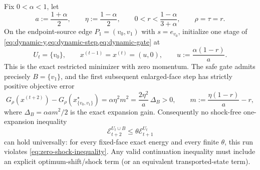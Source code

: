 \begin{proposition}
\label{prop:one-edge-zero-shock-fails}
Fix $0<\alpha<1$, let
\begin{equation}
 a:=\frac{1+\alpha}{2},
 \qquad
 \eta:=\frac{1-\alpha}{2},
 \qquad
 0<r<\frac{1-\alpha}{3+\alpha},
 \qquad
 \rho=\tau=r.
 \label{eq:one-edge-parameters}
\end{equation}
On the endpoint-source edge $P_1=(v_0,v_1)$ with $s=e_{v_0}$, initialize one
stage of \cref{eq:dynamic-y,eq:dynamic-step,eq:dynamic-gate} at
\begin{equation}
 U_t=\{v_0\},
 \qquad
 x^{(t-1)}=x^{(t)}=(u,0),
 \qquad
 u:=\frac{\alpha(1-r)}{a}.
 \label{eq:one-edge-old-state}
\end{equation}
This is the exact restricted minimizer with zero momentum.  The safe gate
admits precisely $B=\{v_1\}$, and the first subsequent enlarged-face step has
strictly positive objective error
\begin{equation}
 G_\rho(x^{(t+2)})-G_\rho(x_{\{v_0,v_1\}}^\star)
 =\alpha\eta^2m^2
 =\frac{2\eta^2}{a}\,\Delta_B>0,
 \qquad
 m:=\frac{\eta(1-r)}a-r,
 \label{eq:one-edge-positive-remainder}
\end{equation}
where
$\Delta_B=\alpha a m^2/2$ is the exact expansion gain.  Consequently no
shock-free one-expansion inequality
\begin{equation}
 \mathcal E_{t+2}^{U_t\cup B}
 \leq\theta\mathcal E_{t+1}^{U_t}
 \label{eq:zero-shock-inequality}
\end{equation}
can hold universally: for every fixed-face exact energy and every finite
$\theta$, this run violates \cref{eq:zero-shock-inequality}.  Any valid
continuation inequality must include an explicit optimum-shift/shock term (or
an equivalent transported-state term).
\end{proposition}

